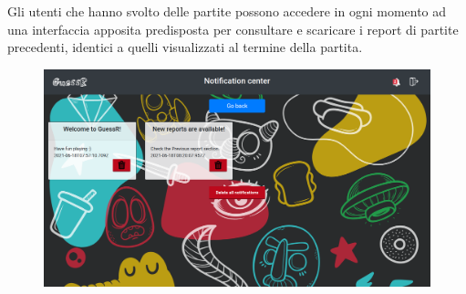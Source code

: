 Gli utenti che hanno svolto delle partite possono accedere in ogni momento ad una interfaccia apposita predisposta per consultare e scaricare i report di partite precedenti, identici a quelli visualizzati al termine della partita.

 \begin{figure}[H]
  \centering
  \begin{minipage}[b]{0.73\textwidth}
    \includegraphics[width=\textwidth]{img/screen/notifications.png}
  \end{minipage}
  \hspace{1cm}
  \begin{minipage}[b]{0.19\textwidth}

\end{minipage}
\end{figure}
